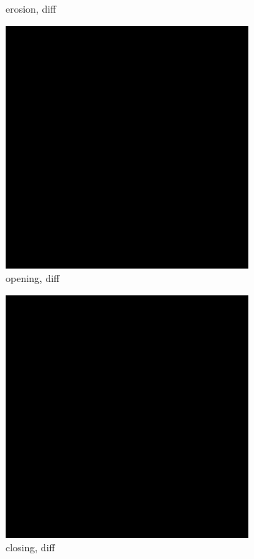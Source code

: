 \begin{figure}[!ht]
\begin{subfigure}[t]{0.22\textwidth}
    \caption{erosion, diff}
    \centering
  \end{subfigure}
\begin{subfigure}[t]{0.22\textwidth}
    \includegraphics[width=0.9\linewidth]{../project/images/outputs/compare_gray/opening_diff.png}
    \caption{opening, diff}
    \centering
  \end{subfigure}
\begin{subfigure}[t]{0.22\textwidth}
    \includegraphics[width=0.9\linewidth]{../project/images/outputs/compare_gray/closing_diff.png}
    \caption{closing, diff}
    \centering
  \end{subfigure}
 \caption{}
 \end{figure}

